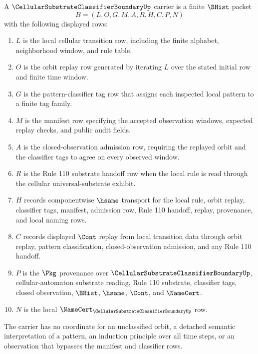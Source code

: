 \begin{definition}
\label{def:cellular-substrate-classifier-boundary-carrier}
A $\CellularSubstrateClassifierBoundaryUp$ carrier is a finite $\BHist$ packet
$$
B=(L,O,G,M,A,R,H,C,P,N)
$$
with the following displayed rows:
\begin{enumerate}
\item $L$ is the local cellular transition row, including the finite alphabet, neighborhood window, and rule table.
\item $O$ is the orbit replay row generated by iterating $L$ over the stated initial row and finite time window.
\item $G$ is the pattern-classifier tag row that assigns each inspected local pattern to a finite tag family.
\item $M$ is the manifest row specifying the accepted observation windows, expected replay checks, and public audit fields.
\item $A$ is the closed-observation admission row, requiring the replayed orbit and the classifier tags to agree on every observed window.
\item $R$ is the Rule 110 substrate handoff row when the local rule is read through the cellular universal-substrate exhibit.
\item $H$ records componentwise $\hsame$ transport for the local rule, orbit replay, classifier tags, manifest, admission row, Rule 110 handoff, replay, provenance, and local naming rows.
\item $C$ records displayed $\Cont$ replay from local transition data through orbit replay, pattern classification, closed-observation admission, and any Rule 110 handoff.
\item $P$ is the $\Pkg$ provenance over $\CellularSubstrateClassifierBoundaryUp$, cellular-automaton substrate reading, Rule 110 substrate, classifier tags, closed observation, $\BHist$, $\hsame$, $\Cont$, and $\NameCert$.
\item $N$ is the local $\NameCert_{\CellularSubstrateClassifierBoundaryUp}$ row.
\end{enumerate}
The carrier has no coordinate for an unclassified orbit, a detached semantic interpretation of a pattern, an induction principle over all time steps, or an observation that bypasses the manifest and classifier rows.
\end{definition}

